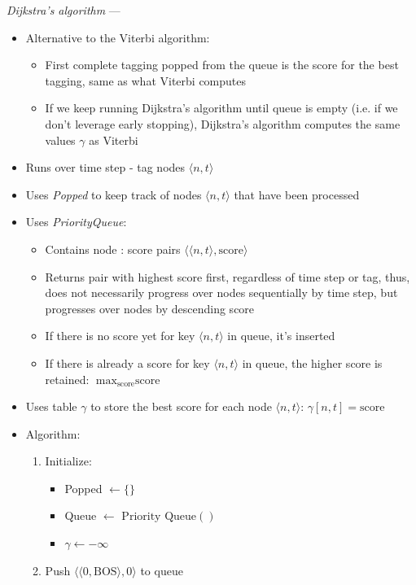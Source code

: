 \emph{Dijkstra’s algorithm} --- 
\begin{itemize}
    \item Alternative to the Viterbi algorithm:
    \begin{itemize}
        \item First complete tagging popped from the queue is the score for the best tagging, same as what Viterbi computes
        \item If we keep running Dijkstra’s algorithm until queue is empty (i.e. if we don't leverage early stopping), Dijkstra’s algorithm computes the same values $\gamma$ as Viterbi
    \end{itemize}
    \item Runs over time step - tag nodes $\langle n, t \rangle$
    \item Uses \emph{Popped} to keep track of nodes $\langle n, t \rangle$ that have been processed
    \item Uses \emph{PriorityQueue}:
    \begin{itemize}
        \item Contains node : score pairs $\langle\langle n, t \rangle, \textrm{score}\rangle$
        \item Returns pair with highest score first, regardless of time step or tag, thus, does not necessarily progress over nodes sequentially by time step, but progresses over nodes by descending score
        \item If there is no score yet for key $\langle n, t \rangle$ in queue, it's inserted
        \item If there is already a score for key $\langle n, t \rangle$ in queue, the higher score is retained: $\max_{\textrm{score}} \textrm{score}$
    \end{itemize}
    \item Uses table $\gamma$ to store the best score for each node $\langle n, t \rangle$: $\gamma[n, t] = \textrm{score}$
    \item Algorithm:
    \begin{enumerate}
        \item Initialize:
        \begin{itemize}
            \item Popped $\gets \{ \}$
            \item Queue $\gets$ $\textrm{Priority Queue}()$
            \item $\gamma \gets -\infty$
        \end{itemize}
        \item Push $\langle\langle 0, \textrm{BOS} \rangle, 0\rangle$ to queue

\end{enumerate}
\end{itemize}

